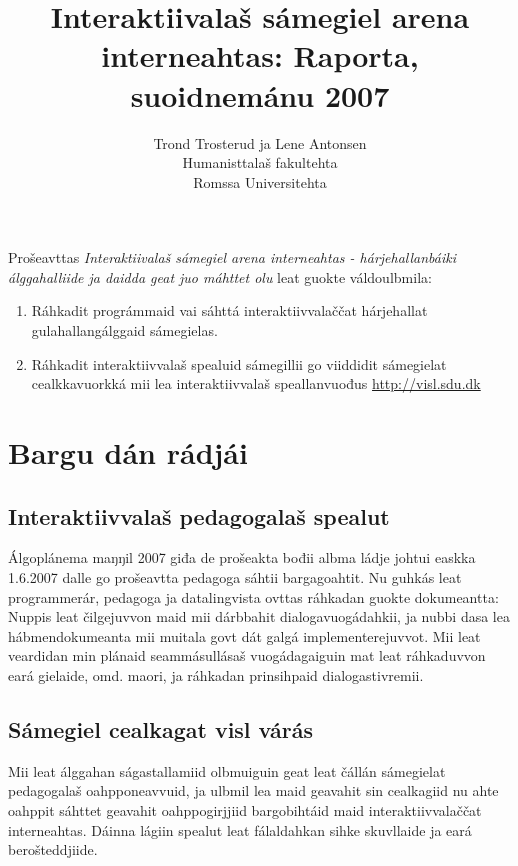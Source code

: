 \documentclass[a4paper,norsk]{article}
\begin{document}
\title{Interaktiivalaš sámegiel arena interneahtas: Raporta, suoidnemánu 2007}


\author{Trond Trosterud ja Lene Antonsen\\
Humanisttalaš fakultehta\\
Romssa Universitehta}

\maketitle


Prošeavttas \textit{Interaktiivalaš sámegiel arena interneahtas - hárjehallanbáiki álggahalliide ja daidda geat juo máhttet olu} leat guokte váldoulbmila: 

\begin{enumerate}
\item Ráhkadit prográmmaid vai sáhttá interaktiivvalaččat hárjehallat gulahallangálggaid sámegielas.
\item Ráhkadit interaktiivvalaš spealuid sámegillii go viiddidit sámegielat cealkkavuorkká mii lea interaktiivvalaš speallanvuođus \url{http://visl.sdu.dk}
\end{enumerate}

\section{Bargu dán rádjái}

\subsection{Interaktiivvalaš pedagogalaš spealut}

Álgoplánema maŋŋil 2007 giđa de prošeakta bođii albma ládje  johtui easkka 1.6.2007 dalle go prošeavtta pedagoga sáhtii bargagoahtit. Nu guhkás leat programmerár, pedagoga ja datalingvista ovttas ráhkadan guokte dokumeantta: Nuppis leat čilgejuvvon maid mii dárbbahit dialogavuogádahkii, ja nubbi dasa lea hábmendokumeanta mii muitala govt dát galgá implementerejuvvot. Mii leat veardidan min plánaid seammásullásaš vuogádagaiguin mat leat ráhkaduvvon eará gielaide, omd. maori, ja ráhkadan prinsihpaid dialogastivremii.

\subsection{Sámegiel cealkagat visl várás}

Mii leat álggahan ságastallamiid olbmuiguin geat leat čállán sámegielat pedagogalaš oahpponeavvuid, ja ulbmil lea maid geavahit sin cealkagiid nu ahte oahppit sáhttet geavahit oahppogirjjiid bargobihtáid maid interaktiivvalaččat interneahtas. Dáinna lágiin spealut leat fálaldahkan sihke skuvllaide ja eará berošteddjiide.
\end{document}
